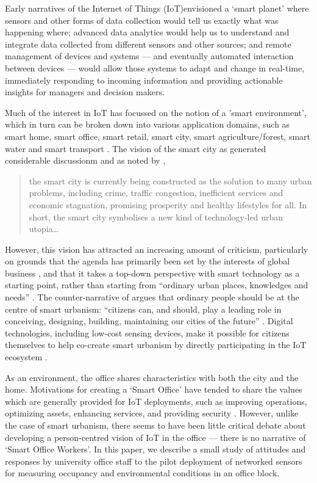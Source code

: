 Early narratives of the Internet of Things (IoT)envisioned a ‘smart planet’
where sensors and other forms of data
collection would tell us exactly what was happening where;
advanced data analytics would help us to understand and integrate data
collected from different sensors and other sources; and remote
management of devices and systems --- and eventually automated
interaction between devices --- would allow those systems to adapt and
change in real-time, immediately responding to incoming information
and providing actionable insights for managers and decision makers.  

Much of the interest in IoT has focussed on the notion of a 'smart
environment', which in turn can be broken down into various
application domains, such as smart home, smart office, smart retail,
smart city, smart agriculture/forest, smart water and smart transport \cite{Gubbi-2013-IOT}.
The vision of the smart city as generated considerable discussionm and
as noted by \cite{Hollands-2015-CIIT}, 

\begin{quote}
  the smart city is currently being constructed as the solution to
  many urban problems, including crime, traffic congestion, inefficient
  services and economic stagnation, promising prosperity and healthy
  lifestyles for all. In short, the smart city symbolises a new kind
  of technology-led urban utopia\ldots
\end{quote}

However, this vision has attracted an increasing amount of criticism,
particularly on grounds that the agenda has primarily been set by the
interests of global business \cite{Hollands-2015-CIIT}, and that it
takes a top-down perspective with smart technology as a starting
point, rather than starting from ``ordinary urban places, knowledges
and needs'' \cite{Mcfarlane-2017-OASC}. The counter-narrative of
 argues that ordinary people should be at the
centre of smart urbanism: ``citizens can, and should, play a leading
role in conceiving, designing, building, maintaining our cities of the
future'' \cite{Hemment-2013-SC,Hemment-2016-HTDU}.
Digital technologies, including low-cost sensing devices, make it
possible for citizens themselves to help co-create smart urbanism by
directly participating in the IoT ecosystem \cite{Balestrini-2017-OCTT}.

As an environment, the office shares characteristics with both the
city and the home. Motivations for creating a `Smart Office' have
tended to share the values which are generally provided for IoT
deployments, such as improving operations, optimizing assets, enhancing
services, and providing security
\cite{Heidt-2016-PGFT,Gaur-2015-SCAA,Gubbi-2013-IOT}. However, unlike
the case of smart urbanism, there seems to have been little
critical debate about developing a person-centred vision of IoT in the
office --- there is no narrative of `Smart Office Workers'.  In this
paper, we describe a small study of attitudes and responses by university office
staff to the pilot deployment of networked sensors for measuring
occupancy and environmental conditions in an office block. 
 
